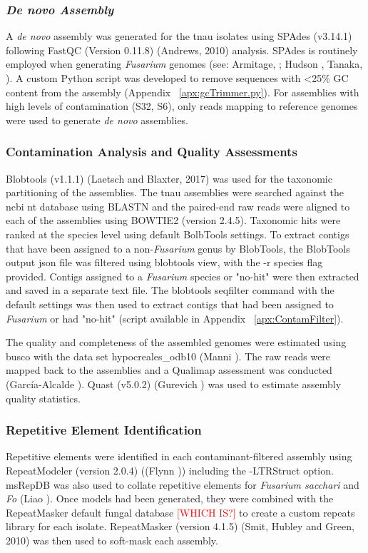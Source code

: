 \subsubsection{\textit{De novo Assembly}}
A \textit{de novo} assembly was generated for the \ac{tnau} isolates using SPAdes (v3.14.1) following FastQC (Version 0.11.8) (Andrews, 2010) analysis. SPAdes is routinely employed when generating \textit{Fusarium} genomes (see: Armitage, ; Hudson , Tanaka, ). A custom Python script was developed to remove sequences with <25\% GC content from the assembly (Appendix ~\ref{apx:gcTrimmer.py}). For assemblies with high levels of contamination (S32, S6), only reads mapping to reference genomes were used to generate \textit{de novo} assemblies.

\subsubsection{Contamination Analysis and Quality Assessments}
Blobtools (v1.1.1) (Laetsch and Blaxter, 2017) was used for the taxonomic partitioning of the assemblies. The \ac{tnau} assemblies were searched against the \ac{ncbi} nt database using BLASTN and the paired-end raw reads were aligned to each of the assemblies using BOWTIE2 (version 2.4.5). Taxonomic hits were ranked at the species level using default BolbTools settings. To extract contigs that have been assigned to a non-\textit{Fusarium} genus by BlobTools, the BlobTools output json file was filtered using blobtools view, with the -r species flag provided. Contigs assigned to a \textit{Fusarium} species or "no-hit" were then extracted and saved in a separate text file. The blobtools seqfilter command with the default settings was then used to extract contigs that had been assigned to \textit{Fusarium} or had "no-hit" (script available in Appendix ~\ref{apx:ContamFilter}).

The quality and completeness of the assembled genomes were estimated using \ac{busco} with the data set hypocreales\_odb10 (Manni ). The raw reads were mapped back to the assemblies and a Qualimap assessment was conducted (García-Alcalde ). Quast (v5.0.2) (Gurevich ) was used to estimate assembly quality statistics. 

\subsubsection{Repetitive Element Identification}

Repetitive elements were identified in each contaminant-filtered assembly using RepeatModeler (version 2.0.4) ((Flynn )) including the -LTRStruct option. msRepDB was also used to collate repetitive elements for \textit{Fusarium sacchari} and \textit{\ac{Fo}} (Liao ). Once models had been generated, they were combined with the RepeatMasker default fungal database \textcolor{red}{[WHICH IS?]} to create a custom repeats library for each isolate. RepeatMasker (version 4.1.5) (Smit, Hubley and Green, 2010) was then used to soft-mask each assembly. 

